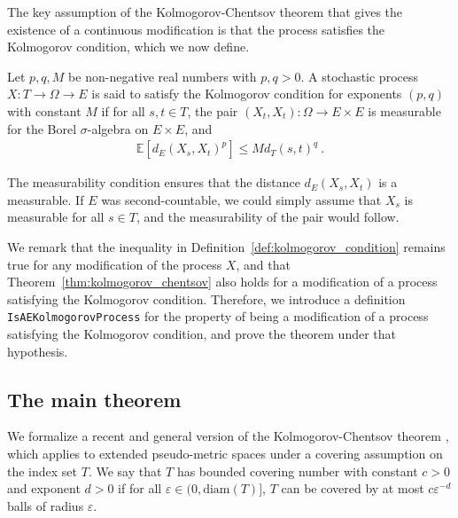 \documentclass[lean]{Draft}
\begin{document}
The key assumption of the Kolmogorov-Chentsov theorem that gives the existence of a continuous modification is that the process satisfies the Kolmogorov condition, which we now define.

\begin{definition}\label{def:kolmogorov_condition}
Let $p, q, M$ be non-negative real numbers with $p,q>0$.
A stochastic process $X : T \to \Omega \to E$ is said to satisfy the Kolmogorov condition for exponents $(p, q)$ with constant $M$ if for all $s, t \in T$, the pair $(X_t, X_t) : \Omega \to E \times E$ is measurable for the Borel $\sigma$-algebra on $E \times E$, and
\begin{align*}
  \mathbb{E}[d_E(X_s, X_t)^p] \le M d_T(s, t)^q
  \: .
\end{align*}
\end{definition}

The measurability condition ensures that the distance $d_E(X_s, X_t)$ is a measurable.
If $E$ was second-countable, we could simply assume that $X_s$ is measurable for all $s \in T$, and the measurability of the pair would follow.

We remark that the inequality in Definition~\ref{def:kolmogorov_condition} remains true for any modification of the process $X$, and that Theorem~\ref{thm:kolmogorov_chentsov} also holds for a modification of a process satisfying the Kolmogorov condition.
Therefore, we introduce a definition \lstinline|IsAEKolmogorovProcess| for the property of being a modification of a process satisfying the Kolmogorov condition, and prove the theorem under that hypothesis.


\subsection{The main theorem}

We formalize a recent and general version of the Kolmogorov-Chentsov theorem \cite[Theorem 1]{kratschmer2023kolmogorov}, which applies to extended pseudo-metric spaces under a covering assumption on the index set $T$.
We say that $T$ has bounded covering number with constant $c > 0$ and exponent $d > 0$ if for all $\varepsilon \in (0, \mathrm{diam}(T)]$, $T$ can be covered by at most $c \varepsilon^{-d}$ balls of radius $\varepsilon$.

\end{document}
